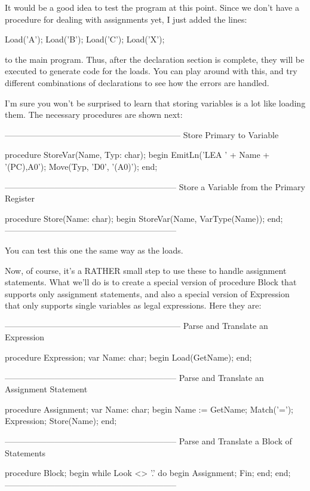 \documentclass[float=false, crop=false]{standalone}
\begin{document}
It would be a good idea to test the program at this point. Since we don't have a
procedure for dealing with assignments yet, I just added the lines:


     Load('A');
     Load('B');
     Load('C');
     Load('X');


to the main program. Thus, after the declaration section is complete, they will
be executed to generate code for the loads. You can play around with this, and
try different combinations of declarations to see how the errors are handled.

I'm sure you won't be surprised to learn that storing variables is a lot like
loading them. The necessary procedures are shown next:


{---------------------------------------------------------------}
{ Store Primary to Variable }

procedure StoreVar(Name, Typ: char);
begin
   EmitLn('LEA ' + Name + '(PC),A0');
   Move(Typ, 'D0', '(A0)');
end;


{--------------------------------------------------------------}
{ Store a Variable from the Primary Register }

procedure Store(Name: char);
begin
   StoreVar(Name, VarType(Name));
end;
{--------------------------------------------------------------}


You can test this one the same way as the loads.

Now, of course, it's a RATHER small step to use these to handle assignment
statements. What we'll do is to create a special version of procedure Block that
supports only assignment statements, and also a special version of Expression
that only supports single variables as legal expressions. Here they are:


{---------------------------------------------------------------}
{ Parse and Translate an Expression }

procedure Expression;
var Name: char;
begin
   Load(GetName);
end;


{--------------------------------------------------------------}
{ Parse and Translate an Assignment Statement }

procedure Assignment;
var Name: char;
begin
   Name := GetName;
   Match('=');
   Expression;
   Store(Name);
end;


{--------------------------------------------------------------}
{ Parse and Translate a Block of Statements }

procedure Block;
begin
   while Look <> '.' do begin
      Assignment;
      Fin;
   end;
end;
{--------------------------------------------------------------}
\end{document}
